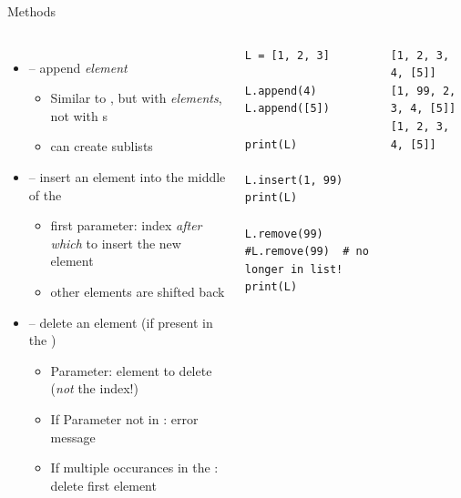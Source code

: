 
\begin{frame}[fragile]{Methods}
%
\vspace{-15pt}
\begin{columns}[t]
\begin{itemize}
\item {} -- append \emph{element}
	\begin{itemize}
	\item Similar to \inPy{+=}, but with \emph{elements}, not with s
	\item can create sublists
	\end{itemize}
\item {} -- insert an element into the middle of the 
	\begin{itemize}
	\item first parameter: index \emph{after which} to insert the new element
	\item other elements are shifted back
	\end{itemize}
\item {} -- delete an element (if present in the )
	\begin{itemize}
	\item Parameter: element to delete (\emph{not} the index!)
	\item If Parameter not in : error message
	\item If multiple occurances in the : delete first element
	\end{itemize}
\end{itemize}
%
\vspace{-40pt}
\begin{codebox}[Examples]
\begin{verbatim}
L = [1, 2, 3]

L.append(4)
L.append([5])

print(L)

L.insert(1, 99)
print(L)

L.remove(99)
#L.remove(99)  # no longer in list!
print(L)
\end{verbatim}
\end{codebox}
%
\begin{cmdbox}[Output]%
\begin{verbatim}
[1, 2, 3, 4, [5]]
[1, 99, 2, 3, 4, [5]]
[1, 2, 3, 4, [5]]
\end{verbatim}
\end{cmdbox}
\end{columns}
%
\end{frame}

